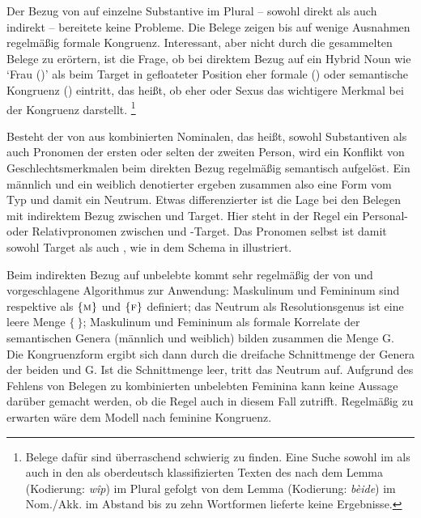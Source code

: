 Der Bezug von  auf einzelne Substantive im Plural -- sowohl direkt
als auch indirekt -- bereitete keine Probleme. Die Belege zeigen bis auf wenige
Ausnahmen regelmäßig formale Kongruenz. Interessant, aber nicht
durch die gesammelten Belege zu erörtern, ist die Frage, ob bei direktem Bezug
auf ein Hybrid Noun wie  `Frau (\NeutF)' als  beim
Target in gefloateter Position eher formale
() oder semantische Kongruenz () eintritt, das heißt, ob
eher  oder Sexus das wichtigere Merkmal bei der Kongruenz darstellt.%
%
	\footnote{Belege dafür sind überraschend schwierig zu finden. Eine Suche
		sowohl im \CAO{} als auch in den als oberdeutsch
		klassifizierten Texten des \REM{} nach dem Lemma  (Kodierung:
		\emph{wîp}) im Plural gefolgt von dem Lemma  (Kodierung:
		\emph{bèide}) im Nom./Akk. im Abstand bis zu zehn
		Wortformen lieferte keine Ergebnisse.}

Besteht der  von  aus kombinierten Nominalen, das
heißt, sowohl Substantiven als auch Pronomen der ersten oder selten der zweiten
Person, wird ein Konflikt von Geschlechtsmerkmalen beim direkten Bezug
regelmäßig semantisch aufgelöst. Ein männlich und ein weiblich
denotierter  ergeben zusammen also eine Form vom
Typ  und damit ein Neutrum. Etwas differenzierter ist die Lage bei
den Belegen mit indirektem Bezug zwischen  und Target. Hier
steht in der Regel ein Personal- oder Relativpronomen zwischen
 und -Target. Das Pronomen selbst ist damit
sowohl Target als auch , wie in dem Schema in
 illustriert.

Beim indirekten Bezug auf unbelebte  kommt sehr regelmäßig
der von \citet[577]{wechsler2009} und \citet[184]{wechslerzlatic2003}
vorgeschlagene Algorithmus zur Anwendung: Maskulinum und Femininum sind
respektive als $\{\textsc{m}\}$ und $\{\textsc{f}\}$ definiert; das Neutrum als
Resolutionsgenus ist eine leere Menge $\{\ \}$;
Maskulinum und Femininum als formale Korrelate der semantischen
Genera (männlich und weiblich) bilden zusammen die Menge G.
Die Kongruenzform ergibt sich dann durch die dreifache Schnittmenge der
Genera der beiden  und G. Ist die
Schnittmenge leer, tritt das Neutrum auf. Aufgrund des Fehlens von Belegen zu
kombinierten unbelebten Feminina kann keine Aussage darüber gemacht werden, ob
die Regel auch in diesem Fall zutrifft. Regelmäßig zu erwarten wäre dem Modell
nach feminine Kongruenz.

